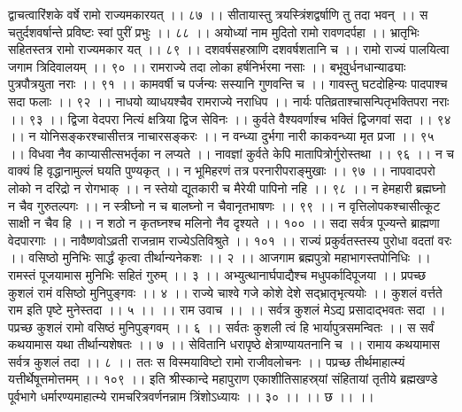 द्वाचत्वारिंशके वर्षे रामो राज्यमकारयत् ।। ८७ ।।
सीतायास्तु त्रयस्त्रिंशद्वर्षाणि तु तदा भवन् ।।
स चतुर्दशवर्षान्ते प्रविष्टः स्वां पुरीं प्रभुः ।। ८८ ।।
अयोध्यां नाम मुदितो रामो रावणदर्पहा ।।
भ्रातृभिः सहितस्तत्र रामो राज्यमकार यत् ।। ८९ ।।
दशवर्षसहस्राणि दशवर्षशतानि च ।।
रामो राज्यं पालयित्वा जगाम त्रिदिवालयम् ।। ९० ।।
रामराज्ये तदा लोका हर्षनिर्भरमा नसाः ।।
बभूवुर्धनधान्याढ्याः पुत्रपौत्रयुता नराः ।। ९१ ।।
कामवर्षी च पर्जन्यः सस्यानि गुणवन्ति च ।।
गावस्तु घटदोहिन्यः पादपाश्च सदा फलाः ।। ९२ ।।
नाधयो व्याधयश्चैव रामराज्ये नराधिप ।।
नार्यः पतिव्रताश्चासन्पितृभक्तिपरा नराः ।। ९३ ।।
द्विजा वेदपरा नित्यं क्षत्रिया द्विज सेविनः ।।
कुर्वते वैश्यवर्णाश्च भक्तिं द्विजगवां सदा ।। ९४ ।।
न योनिसङ्करश्चासीत्तत्र नाचारसङ्करः ।।
न वन्ध्या दुर्भगा नारी काकवन्ध्या मृत प्रजा ।। ९५ ।।
विधवा नैव काप्यासीत्सभर्तृका न लप्यते ।।
नावज्ञां कुर्वते केपि मातापित्रोर्गुरोस्तथा ।। ९६ ।।
न च वाक्यं हि वृद्धानामुल्लं घयति पुण्यकृत् ।।
न भूमिहरणं तत्र परनारीपराङ्मुखाः ।। ९७ ।।
नापवादपरो लोको न दरिद्रो न रोगभाक् ।।
न स्तेयो द्यूतकारी च मैरेयी पापिनो नहि ।। ९८ ।।
न हेमहारी ब्रह्मघ्नो न चैव गुरुतल्पगः ।।
न स्त्रीघ्नो न च बालघ्नो न चैवानृतभाषणः ।। ९९ ।।
न वृत्तिलोपकश्चासीत्कूट साक्षी न चैव हि ।।
न शठो न कृतघ्नश्च मलिनो नैव दृश्यते ।। १०० ।।
सदा सर्वत्र पूज्यन्ते ब्राह्मणा वेदपारगाः ।।
नावैष्णवोऽव्रती राजन्राम राज्येऽतिविश्रुते ।। १०१ ।।
राज्यं प्रकुर्वतस्तस्य पुरोधा वदतां वरः ।।
वसिष्ठो मुनिभिः सार्द्धं कृत्वा तीर्थान्यनेकशः ।। २ ।।
आजगाम ब्रह्मपुत्रो महाभागस्तपोनिधिः ।।
रामस्तं पूजयामास मुनिभिः सहितं गुरुम् ।। ३ ।।
अभ्युत्थानार्घपाद्यैश्च मधुपर्कादिपूजया ।।
प्रपच्छ कुशलं रामं वसिष्ठो मुनिपुङ्गवः ।। ४ ।।
राज्ये चाश्वे गजे कोशे देशे सद्भ्रातृभृत्ययोः ।।
कुशलं वर्त्तते राम इति पृष्टे मुनेस्तदा ।। ५ ।।
।। राम उवाच ।। ।।
सर्वत्र कुशलं मेऽद्य प्रसादाद्भवतः सदा ।।
पप्रच्छ कुशलं रामो वसिष्ठं मुनिपुङ्गवम् ।। ६ ।।
सर्वतः कुशली त्वं हि भार्यापुत्रसमन्वितः ।।
स सर्वं कथयामास यथा तीर्थान्यशेषतः ।। ७ ।।
सेवितानि धरापृष्ठे क्षेत्राण्यायतनानि च ।।
रामाय कथयामास सर्वत्र कुशलं तदा ।। ८ ।।
ततः स विस्मयाविष्टो रामो राजीवलोचनः ।।
पप्रच्छ तीर्थमाहात्म्यं यत्तीर्थेषूत्तमोत्तमम् ।। १०९ ।।
इति श्रीस्कान्दे महापुराण एकाशीतिसाहस्र्यां संहितायां तृतीये ब्रह्मखण्डे पूर्वभागे धर्मारण्यमाहात्म्ये रामचरित्रवर्णनन्नाम त्रिंशोऽध्यायः ।। ३० ।। ।। छ ।। ।।


